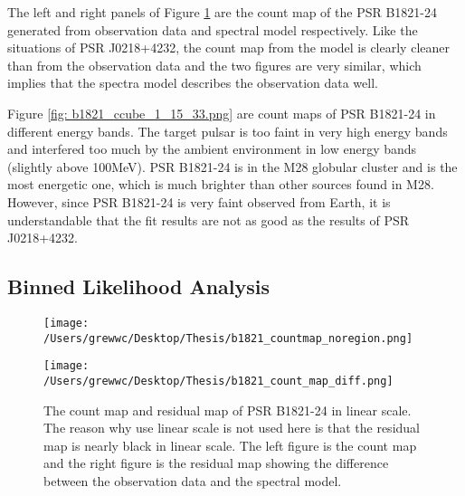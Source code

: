 \documentclass[12pt]{report}
\begin{document}
              The left and right panels of Figure \ref{fig: b1821_count_map_diff.png} are the count 
              map of the PSR B1821-24 generated from observation data and spectral model respectively. 
              Like the situations of PSR J0218+4232, the count map from the model is clearly cleaner than 
              from the observation data and the two figures are very similar, which implies that 
              the spectra model describes the observation data well.  

              Figure \ref{fig: b1821_ccube_1_15_33.png} are count maps of PSR B1821-24 in 
              different energy bands. The target pulsar is too faint in very high energy bands 
              and interfered too much by the ambient environment in low energy bands 
              (slightly above 100MeV). PSR B1821-24 is in the M28 globular cluster and is the most 
              energetic one, which is much brighter than other sources found in M28. However, since 
              PSR B1821-24 is very faint observed from Earth, it is understandable that the fit 
              results are not as good as the results of PSR J0218+4232. 
              \subsection{Binned Likelihood Analysis}
              \begin{figure}[!ht]
                \begin{center}
                \begin{minipage}{0.45\textwidth}
                  \begin{center} 
                    \texttt{[image: /Users/grewwc/Desktop/Thesis/b1821\_countmap\_noregion.png]}
                  \end{center}
                \end{minipage}
                \begin{minipage}{0.45\textwidth}
                  \begin{center}
                    \texttt{[image: /Users/grewwc/Desktop/Thesis/b1821\_count\_map\_diff.png]}
                  \end{center}
                \end{minipage}
              \end{center}
              \caption{The count map and residual map of PSR B1821-24 in linear scale. 
                The reason why use linear scale is not used here is that the residual map is 
                nearly black in linear scale. The \textsf{left} figure is the count map and the 
                \textsf{right} figure is the residual map showing the difference between the 
                observation data and the spectral model.}
              \label{fig: b1821_count_map_diff.png}
            \end{figure}
\end{document}
